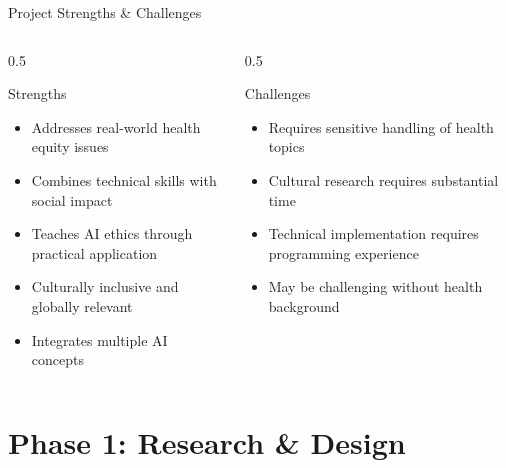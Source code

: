 \documentclass[aspectratio=169]{beamer}
\begin{document}
\begin{frame}{Project Strengths \& Challenges}
    \begin{columns}[t]
        \begin{column}{0.5\textwidth}
            \begin{block}{Strengths}
                \begin{itemize}
                    \item Addresses real-world health equity issues
                    \item Combines technical skills with social impact
                    \item Teaches AI ethics through practical application
                    \item Culturally inclusive and globally relevant
                    \item Integrates multiple AI concepts
                \end{itemize}
            \end{block}
        \end{column}
        \begin{column}{0.5\textwidth}
            \begin{alertblock}{Challenges}
                \begin{itemize}
                    \item Requires sensitive handling of health topics
                    \item Cultural research requires substantial time
                    \item Technical implementation requires programming experience
                    \item May be challenging without health background
                \end{itemize}
            \end{alertblock}
        \end{column}
    \end{columns}
\end{frame}

\section{Phase 1: Research \& Design}
\end{document}
